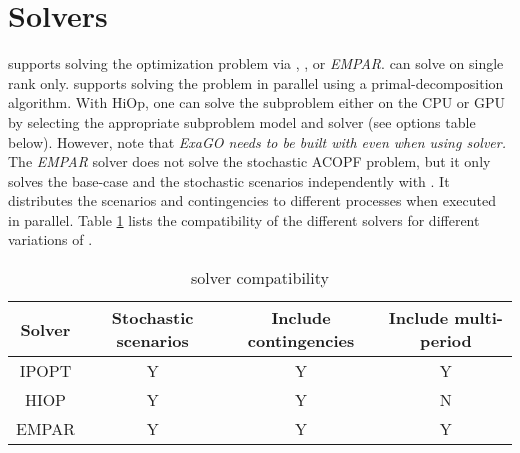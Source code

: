 \section{Solvers}
\sopflow supports solving the optimization problem via \ipopt, \hiop, or \emph{EMPAR}. \ipopt can solve \sopflow on single rank only. \hiop supports solving the problem in parallel using a primal-decomposition algorithm. With HiOp, one can solve the subproblem either on the CPU or GPU by selecting the appropriate subproblem model and solver (see options table below). However, note that \emph{ExaGO needs to be built with \ipopt even when using \hiop solver.} The \emph{EMPAR} solver does not solve the stochastic ACOPF problem, but it only solves the base-case and the stochastic scenarios independently with \opflow. It distributes the scenarios and contingencies to different processes when executed in parallel. Table \ref{tab:sopflow_solvers} lists the compatibility of the different solvers for different variations of \sopflow.

\begin{center}
\begin{table}[!htbp]
    \centering
    \caption{\sopflow solver compatibility}
    \begin{tabular}{|c|c|c|c|}
      \hline
      \textbf{Solver} & \textbf{Stochastic scenarios} & \textbf{Include contingencies} & \textbf{Include multi-period} \\
      \hline
      IPOPT   & Y & Y & Y \\ \hline
      HIOP & Y & Y  & N \\ \hline
      EMPAR  & Y & Y  & Y \\ \hline
    \end{tabular}
    \label{tab:sopflow_solvers}
\end{table}
\end{center}


